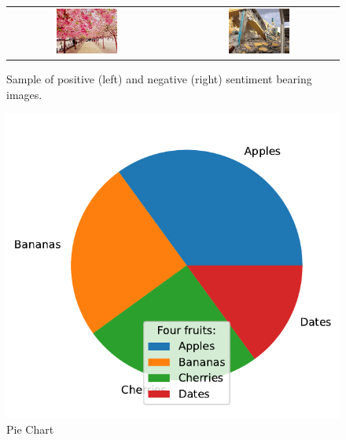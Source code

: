 \documentclass[11pt]{article}
\begin{document}

\begin{figure}[!htb]
\centering
\begin{tabular}{cp{0.5cm}c}
\includegraphics[width=0.4\textwidth]{Pos4.jpg}
&
&\includegraphics[width=0.4\textwidth]{Neg3.jpg}
\end{tabular}
\caption{Sample of positive (left) and negative (right) sentiment bearing images.}
\label{Fig:sampleImage}
\end{figure}

\begin{figure}[H] %
\centering
\includegraphics[scale=0.8]{Python-Plot.pdf}
\caption{Pie Chart}
\label{fig:pie}
\end{figure}
\end{document}
